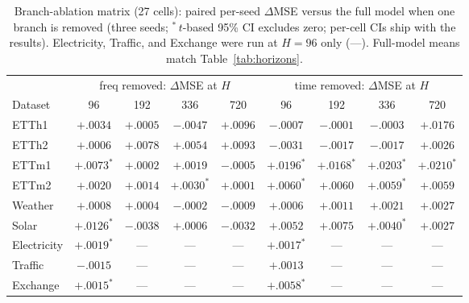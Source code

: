 \documentclass[runningheads]{llncs}
\begin{document}
\begin{table}[tb]
\centering
\caption{Branch-ablation matrix (27 cells): paired per-seed $\Delta$MSE
versus the full model when one branch is removed (three seeds;
$^{*}$\,$t$-based 95\% CI excludes zero; per-cell CIs ship with the
results). Electricity, Traffic, and Exchange were run at $H{=}96$ only
(---). Full-model means match Table~\ref{tab:horizons}.}
\label{tab:branchmatrix}
\scriptsize
\setlength{\tabcolsep}{3.4pt}
\begin{tabular}{@{}lcccccccc@{}}
\toprule
& \multicolumn{4}{c}{freq removed: $\Delta$MSE at $H$}
& \multicolumn{4}{c}{time removed: $\Delta$MSE at $H$} \\
\cmidrule(lr){2-5}\cmidrule(l){6-9}
Dataset & 96 & 192 & 336 & 720 & 96 & 192 & 336 & 720 \\
\midrule
ETTh1 & $+.0034$ & $+.0005$ & $-.0047$ & $+.0096$ & $-.0007$ & $-.0001$ & $-.0003$ & $+.0176$ \\
ETTh2 & $+.0006$ & $+.0078$ & $+.0054$ & $+.0093$ & $-.0031$ & $-.0017$ & $-.0017$ & $+.0026$ \\
ETTm1 & $+.0073^{*}$ & $+.0002$ & $+.0019$ & $-.0005$ & $+.0196^{*}$ & $+.0168^{*}$ & $+.0203^{*}$ & $+.0210^{*}$ \\
ETTm2 & $+.0020$ & $+.0014$ & $+.0030^{*}$ & $+.0001$ & $+.0060^{*}$ & $+.0060$ & $+.0059^{*}$ & $+.0059$ \\
Weather & $+.0008$ & $+.0004$ & $-.0002$ & $-.0009$ & $+.0006$ & $+.0011$ & $+.0021$ & $+.0027$ \\
Solar & $+.0126^{*}$ & $-.0038$ & $+.0006$ & $-.0032$ & $+.0052$ & $+.0075$ & $+.0040^{*}$ & $+.0027$ \\
Electricity & $+.0019^{*}$ & --- & --- & --- & $+.0017^{*}$ & --- & --- & --- \\
Traffic & $-.0015$ & --- & --- & --- & $+.0013$ & --- & --- & --- \\
Exchange & $+.0015^{*}$ & --- & --- & --- & $+.0058^{*}$ & --- & --- & --- \\
\bottomrule
\end{tabular}
\end{table}
\end{document}
